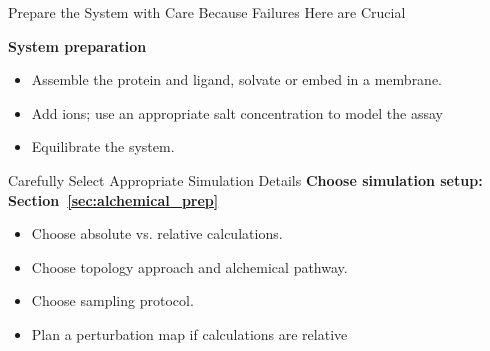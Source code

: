 \documentclass[9pt,bestpractices]{livecoms}
\begin{document}
\begin{Checklists*}
\begin{checklist}{Prepare the System with Care Because Failures Here are Crucial}
\begin{itemize}
\begin{itemize}
    \end{itemize}
    \end{itemize}
        \textbf{System preparation}
    \begin{itemize}
        \item Assemble the protein and ligand, solvate or embed in a membrane. 
        \item Add ions; use an appropriate salt concentration to model the assay
        \item Equilibrate the system.
    \end{itemize}
\end{checklist}

\begin{checklist}{Carefully Select Appropriate Simulation Details}
\textbf{Choose simulation setup: Section~\ref{sec:alchemical_prep}}
    \begin{itemize}
        \item Choose absolute vs. relative calculations.
        \item Choose topology approach and alchemical pathway.
        \item Choose sampling protocol.
        \item Plan a perturbation map if calculations are relative
    \end{itemize}
\end{checklist}
\end{Checklists*}
\end{document}
